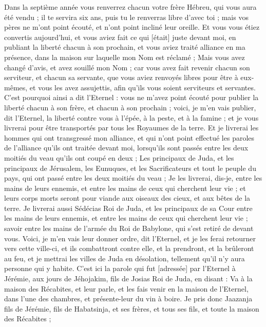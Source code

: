 \begin{multicols}{2}
Dans la septième année vous renverrez chacun votre frère Hébreu, qui vous aura été vendu ; il te servira six ans, puis tu le renverras libre d'avec toi ; mais vos pères ne m'ont point écouté, et n'ont point incliné leur oreille.
Et vous vous étiez convertis aujourd'hui, et vous aviez fait ce qui [était] juste devant moi, en publiant la liberté chacun à son prochain, et vous aviez traité alliance en ma présence, dans la maison sur laquelle mon Nom est réclamé ;
Mais vous avez changé d'avis, et avez souillé mon Nom ; car vous avez fait revenir chacun son serviteur, et chacun sa servante, que vous aviez renvoyés libres pour être à eux-mêmes, et vous les avez assujettis, afin qu'ils vous soient serviteurs et servantes.
C'est pourquoi ainsi a dit l'Eternel : vous ne m'avez point écouté pour publier la liberté chacun à son frère, et chacun à son prochain ; voici, je m'en vais publier, dit l'Eternel, la liberté contre vous à l'épée, à la peste, et à la famine ; et je vous livrerai pour être transportés par tous les Royaumes de la terre.
Et je livrerai les hommes qui ont transgressé mon alliance, et qui n'ont point effectué les paroles de l'alliance qu'ils ont traitée devant moi, lorsqu'ils sont passés entre les deux moitiés du veau qu'ils ont coupé en deux ;
Les principaux de Juda, et les principaux de Jérusalem, les Eunuques, et les Sacrificateurs et tout le peuple du pays, qui ont passé entre les deux moitiés du veau ;
Je les livrerai, dis-je, entre les mains de leurs ennemis, et entre les mains de ceux qui cherchent leur vie ; et leurs corps morts seront pour viande aux oiseaux des cieux, et aux bêtes de la terre.
Je livrerai aussi Sédécias Roi de Juda, et les principaux de sa Cour entre les mains de leurs ennemis, et entre les mains de ceux qui cherchent leur vie ; savoir entre les mains de l'armée du Roi de Babylone, qui s'est retiré de devant vous.
Voici, je m'en vais leur donner ordre, dit l'Eternel, et je les ferai retourner vers cette ville-ci, et ils combattront contre elle, et la prendront, et la brûleront au feu, et je mettrai les villes de Juda en désolation, tellement qu'il n'y aura personne qui y habite.
\VerseOne{}C'est ici la parole qui fut [adressée] par l'Eternel à Jérémie, aux jours de Jéhojakim, fils de Josias Roi de Juda, en disant :
Va à la maison des Récabites, et leur parle, et les fais venir en la maison de l'Eternel, dans l'une des chambres, et présente-leur du vin à boire.
Je pris donc Jaazanja fils de Jérémie, fils de Habatsinja, et ses frères, et tous ses fils, et toute la maison des Récabites ;

\end{multicols}
